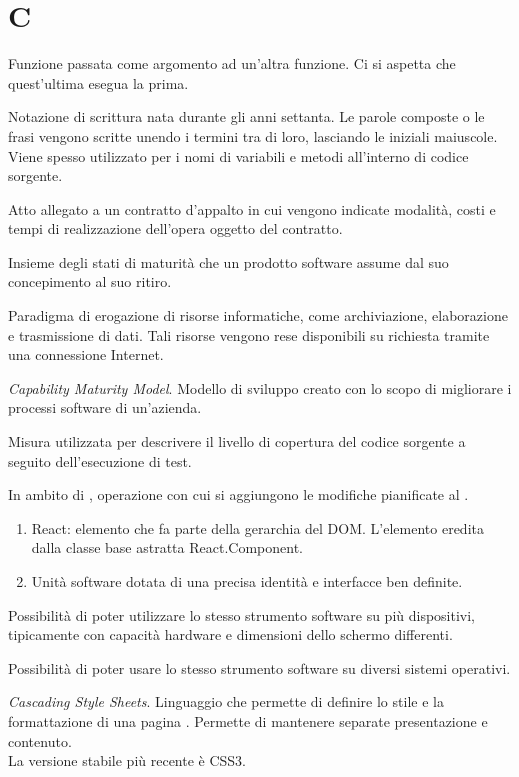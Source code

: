 
\section{C}

Funzione passata come argomento ad un'altra funzione. Ci si aspetta che quest'ultima esegua la prima.

Notazione di scrittura nata durante gli anni settanta. Le parole composte o le frasi vengono scritte unendo i termini tra di loro, lasciando le iniziali maiuscole. Viene spesso utilizzato per i nomi di variabili e metodi all'interno di codice sorgente.

Atto allegato a un contratto d'appalto in cui vengono indicate modalità, costi e tempi di realizzazione dell'opera oggetto del contratto.


Insieme degli stati di maturità che un prodotto software assume dal suo concepimento al suo ritiro.

Paradigma di erogazione di risorse informatiche, come archiviazione, elaborazione e trasmissione di dati. Tali risorse vengono rese disponibili su richiesta tramite una connessione Internet.

\textit{Capability Maturity Model}. Modello di sviluppo creato con lo scopo di migliorare i processi software di un'azienda.

Misura utilizzata per descrivere il livello di copertura del codice sorgente a seguito dell'esecuzione di test.

In ambito di , operazione con cui si aggiungono le modifiche pianificate al .

\begin{enumerate}
	\item React: elemento che fa parte della gerarchia del DOM. L'elemento eredita dalla classe base astratta React.Component.
	\item Unità software dotata di una precisa identità e interfacce ben definite.
\end{enumerate}

Possibilità di poter utilizzare lo stesso strumento software su più dispositivi, tipicamente con capacità hardware e dimensioni dello schermo differenti.

Possibilità di poter usare lo stesso strumento software su diversi sistemi operativi.

\textit{Cascading Style Sheets}. Linguaggio che permette di definire lo stile e la formattazione di una pagina . Permette di mantenere separate presentazione e contenuto. \\
La versione stabile più recente è CSS3.

